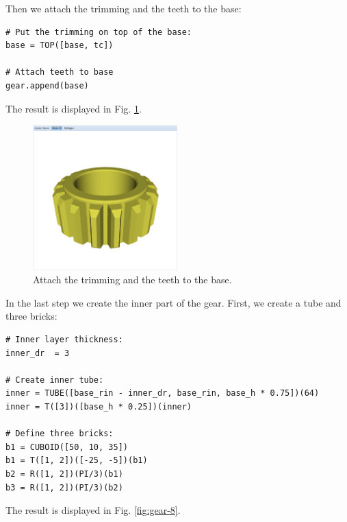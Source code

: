 \documentclass{article}
\begin{document}
\noindent
Then we attach the trimming and the teeth to the base:

{\small
\begin{verbatim}
# Put the trimming on top of the base:
base = TOP([base, tc])

# Attach teeth to base
gear.append(base) 
\end{verbatim}
}
\noindent
The result is displayed in Fig. \ref{fig:gear-7}.

\begin{figure}[!ht]
\begin{center}
\includegraphics[width=0.5\textwidth]{img/gear-7.png}
\end{center}
\vspace{-2mm}
\caption{Attach the trimming and the teeth to the base.}
\label{fig:gear-7}
\end{figure}
\noindent
In the last step we create the inner part of the gear. First, we create 
a tube and three bricks:

{\small
\begin{verbatim}
# Inner layer thickness:
inner_dr  = 3

# Create inner tube:
inner = TUBE([base_rin - inner_dr, base_rin, base_h * 0.75])(64)
inner = T([3])([base_h * 0.25])(inner) 

# Define three bricks:
b1 = CUBOID([50, 10, 35])
b1 = T([1, 2])([-25, -5])(b1)
b2 = R([1, 2])(PI/3)(b1)
b3 = R([1, 2])(PI/3)(b2)
\end{verbatim}
}
\noindent
The result is displayed in Fig. \ref{fig:gear-8}.
\end{document}
